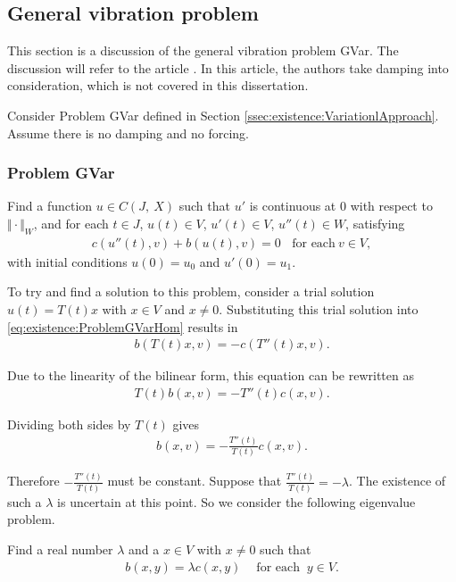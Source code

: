 \documentclass[../../main.tex]{subfiles}
\begin{document}
\subsection{General vibration problem}
This section is a discussion of the general vibration problem GVar. The discussion will refer to the article \cite{CVV18}. In this article, the authors take damping into consideration, which is not covered in this dissertation. 

Consider Problem GVar defined in Section \ref{ssec:existence:VariationlApproach}. Assume there is no damping and no forcing. 

\subsubsection*{Problem GVar}\label{sssec:existence:ProblemGVar}
Find a function $u \in C(J,\ X)$ such that $u'$ is continuous at $0$ with respect to $\Vert \cdot \Vert_{W}$, and for each $t \in J$, $u(t) \in V$, $u'(t) \in V$, $u''(t) \in W$, satisfying
\begin{eqnarray}
c(u''(t),v)+b(u(t),v) = 0 \ \ \ \ \textrm{for each} \ v \in V, \label{eq:existence:ProblemGVarHom}
\end{eqnarray}
with initial conditions $u(0) = u_0$ and $u'(0) = u_1$.

To try and find a solution to this problem, consider a trial solution $u(t) = T(t)x$ with $x \in V$ and $x \neq 0$. Substituting this trial solution into \eqref{eq:existence:ProblemGVarHom} results in
\begin{eqnarray*}
	b(T(t)x,v) = - c(T''(t)x,v).  \label{eq:existence:ProblemGVarHom:Substitution}
\end{eqnarray*}

Due to the linearity of the bilinear form, this equation can be rewritten as
\begin{eqnarray*}
	T(t)b(x,v) = - T''(t)c(x,v).
\end{eqnarray*}

Dividing both sides by $T(t)$ gives
\begin{eqnarray*}
	b(x,v) = - \frac{T''(t)}{T(t)}c(x,v).
\end{eqnarray*}

Therefore $\displaystyle -\frac{T''(t)}{T(t)}$ must be constant. Suppose that $\displaystyle \frac{T''(t)}{T(t)} = -\lambda$. The existence of such a $\lambda$ is uncertain at this point. So we consider the following eigenvalue problem.

Find a real number $\lambda$ and a $x \in V$ with $x \neq 0$ such that
\begin{eqnarray*}
	b(x,y) = \lambda c(x,y) \ \ \ \ \textrm{ for each } \ y \in V.
\end{eqnarray*}
\end{document}
